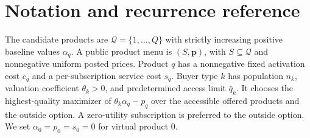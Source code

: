 \section*{Notation and recurrence reference}
The candidate products are $\mathcal Q=\{1,\ldots,Q\}$ with strictly increasing positive baseline values $\alpha_q$. A public product menu is $(S,\mathbf p)$, with $S\subseteq\mathcal Q$ and nonnegative uniform posted prices. Product $q$ has a nonnegative fixed activation cost $c_q$ and a per-subscription service cost $s_q$. Buyer type $k$ has population $n_k$, valuation coefficient $\theta_k>0$, and predetermined access limit $\bar q_k$. It chooses the highest-quality maximizer of $\theta_k\alpha_q-p_q$ over the accessible offered products and the outside option. A zero-utility subscription is preferred to the outside option. We set $\alpha_0=p_0=s_0=0$ for virtual product 0.

